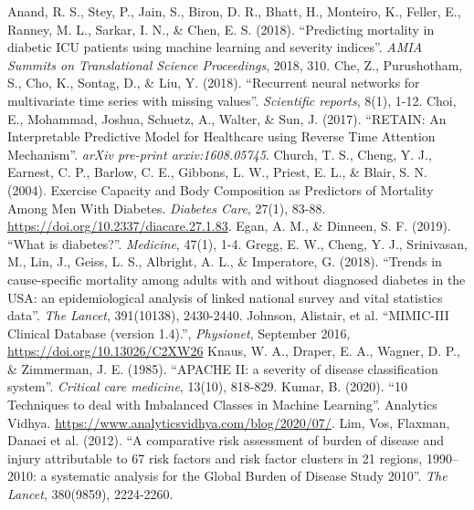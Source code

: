 \documentclass{sigkddExp}
\begin{document}
\begin{thebibliography}{6}
       Anand, R. S., Stey, P., Jain, S., Biron, D. R., Bhatt, H., Monteiro, K., Feller, E., Ranney, M. L., Sarkar, I. N., \& Chen, E. S. (2018). ``Predicting mortality in diabetic ICU patients using machine learning and severity indices''. \textit{AMIA Summits on Translational Science Proceedings}, 2018, 310.
       Che, Z., Purushotham, S., Cho, K., Sontag, D., \& Liu, Y. (2018). ``Recurrent neural networks for multivariate time series with missing values''. \textit{Scientific reports}, 8(1), 1-12.
       Choi, E., Mohammad, Joshua, Schuetz, A., Walter, \& Sun, J. (2017). ``RETAIN: An Interpretable Predictive Model for Healthcare using Reverse Time Attention Mechanism''. \textit{arXiv pre-print arxiv:1608.05745}.
       Church, T. S., Cheng, Y. J., Earnest, C. P., Barlow, C. E., Gibbons, L. W., Priest, E. L., \& Blair, S. N. (2004). Exercise Capacity and Body Composition as Predictors of Mortality Among Men With Diabetes. \textit{Diabetes Care}, 27(1), 83-88. \url{https://doi.org/10.2337/diacare.27.1.83}.
       Egan, A. M., \& Dinneen, S. F. (2019). ``What is diabetes?''. \textit{Medicine}, 47(1), 1-4.
       Gregg, E. W., Cheng, Y. J., Srinivasan, M., Lin, J., Geiss, L. S., Albright, A. L., \& Imperatore, G. (2018). ``Trends in cause-specific mortality among adults with and without diagnosed diabetes in the USA: an epidemiological analysis of linked national survey and vital statistics data''. \textit{The Lancet}, 391(10138), 2430-2440.
       Johnson, Alistair, et al. ``MIMIC-III Clinical Database (version 1.4).'', \textit{Physionet}, September 2016, \url{https://doi.org/10.13026/C2XW26}
       Knaus, W. A., Draper, E. A., Wagner, D. P., \& Zimmerman, J. E. (1985). ``APACHE II: a severity of disease classification system''. \textit{Critical care medicine}, 13(10), 818-829.
       Kumar, B. (2020). ``10 Techniques to deal with Imbalanced Classes in Machine Learning''. Analytics Vidhya. \href{https://www.analyticsvidhya.com/blog/2020/07/10-techniques-to-deal-with-class-imbalance-in-machine-learning/}{https://www.analyticsvidhya.com/blog/2020/07/}.
       Lim, Vos, Flaxman, Danaei et al. (2012). ``A comparative risk assessment of burden of disease and injury attributable to 67 risk factors and risk factor clusters in 21 regions, 1990–2010: a systematic analysis for the Global Burden of Disease Study 2010''.  \textit{The Lancet}, 380(9859), 2224-2260.       

\end{thebibliography}
\end{document}
